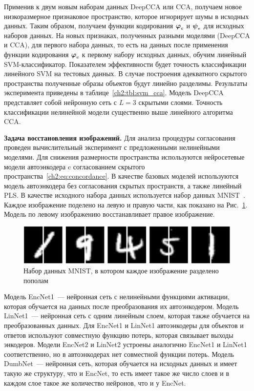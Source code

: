 Применив к двум новым наборам данных DeepCCA или CCA, получаем новое низкоразмерное признаковое пространство, которое игнорирует шумы в исходных данных. Таким образом, получаем функции кодирования $\boldsymbol{\varphi}_e$ и $\boldsymbol{\psi}_e$ для исходных наборов данных. На новых признаках, полученных разными моделями (DeepCCA и CCA), для первого набора данных, то есть на данных после применения функции кодирования $\boldsymbol{\varphi}_e$ к первому набору исходных данных, обучим линейный SVM-классификатор. Показателем эффективности будет точность классификации линейного SVM на тестовых данных. В случае построения адекватного скрытого пространства полученные образы объектов будут линейно разделимы. Результаты эксперимента приведены в таблице~\ref{ch2:tbl:svm_cca}. Модель DeepCCA представляет собой нейронную сеть с $L=3$ скрытыми слоями. Точность классификации нелинейной модели существенно выше линейного алгоритма CCA.

\textbf{Задача восстановления изображений.}
Для анализа процедуры согласования проведен вычислительный эксперимент с предложенными нелинейными моделями.
Для снижения размерности пространства используются нейросетевые модели автоэнкодера c согласованием скрытого пространства~\eqref{ch2:eq:concordance}.
В качестве базовых моделей используются модель автоэнкодера без согласования скрытых пространств, а также линейный PLS. В качестве исходного набора данных используется набор данных MNIST~\cite{MNIST}. Каждое изображение поделено на левую и правую части, как показано на Рис.~\ref{ch2:fig:left_right_mnist}. Модель по левому изображению восстанавливает правое изображение.

\begin{figure}[ht]
\centering \includegraphics[width=\linewidth]{figs/ch2/left_right_mnist}
\caption{Набор данных MNIST, в котором каждое изображение разделено пополам}
\label{ch2:fig:left_right_mnist}
\end{figure}

Модель EncNet1~--- нейронная сеть с нелинейными функциями активации, которая обучается на данных после преобразования их автоэнкодером. Модель LinNet1~--- нейронная сеть с одним линейным слоем, которая также обучается на преобразованных данных. Для EncNet1 и LinNet1 автоэнкодеры для объектов и ответов используют совместную функцию потерь, которая связывает выходы энкодеров. Модели EncNet2 и LinNet2 устроены аналогично EncNet1 и LinNet1 соответственно, но в автоэнкодерах нет совместной функции потерь. Модель DumbNet~---  нейронная сеть, которая обучается на исходных данных и имеет такую же структуру, что и EncNet, то есть имеет такое же число слоев и в каждом слое такое же количество нейронов, что и у EncNet.

